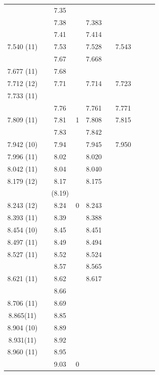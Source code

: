 {\begin{landscape}
\begin{center}
\begin{longtable}{cc cc cc cc cc}
	&		&	7.35	&		&	   	&		&		&		&		&		\\
	&		&	7.38	&		&	7.383	&		&		&		&		&		\\
	&		&	7.41	&		&	7.414	&		&		&		&		&		\\
  7.540 (11)  	&		&	7.53	&		&	7.528	&		&	7.543	&		&		&		\\
	&		&	7.67	&		&	7.668	&		&		&		&		&		\\
  7.677 (11)  	&		&	7.68	&		&	   	&		&		&		&		&		\\
  7.712 (12)  	&		&	7.71	&		&	7.714	&		&	7.723	&		&		&		\\
  7.733 (11)  	&		&		&		&		&		&		&		&		&		\\
	&		&	7.76	&		&	7.761	&		&	7.771	&		&		&		\\
  7.809 (11)  	&		&	7.81	&	1	&	7.808	&		&	7.815	&		&		&		\\
	&		&	7.83	&		&	7.842	&		&		&		&		&		\\
  7.942 (10)  	&		&	7.94	&		&	7.945	&		&	7.950	&		&		&		\\
  7.996 (11)  	&		&	8.02	&		&	8.020	&		&		&		&		&		\\
  8.042 (11)  	&		&	8.04	&		&	8.040	&		&		&		&		&		\\
  8.179 (12)  	&		&	8.17	&		&	8.175	&		&		&		&		&		\\
	&		&	(8.19)	&		&	  	&		&		&		&		&		\\
  8.243 (12)  	&		&	8.24	&	0	&	8.243	&		&		&		&		&		\\
  8.393 (11)  	&		&	8.39	&		&	8.388	&		&		&		&		&		\\
  8.454 (10)  	&		&	8.45	&		&	8.451	&		&		&		&		&		\\
  8.497 (11)  	&		&	8.49	&		&	8.494	&		&		&		&		&		\\
  8.527 (11)  	&		&	8.52	&		&	8.524	&		&		&		&		&		\\
	&		&	8.57	&		&	8.565	&		&		&		&		&		\\
  8.621 (11)  	&		&	8.62	&		&	8.617	&		&		&		&		&		\\
	&		&	8.66	&		&		&		&		&		&		&		\\
  8.706 (11)  	&		&	8.69	&		&		&		&		&		&		&		\\
   8.865(11)  	&		&	8.85	&		&		&		&		&		&		&		\\
  8.904 (10)  	&		&	8.89	&		&		&		&		&		&		&		\\
8.931(11)	&		&	8.92	&		&		&		&		&		&		&		\\
  8.960 (11)  	&		&	8.95	&		&		&		&		&		&		&		\\
	&		&	9.03	&	0	&		&		&		&		&		&		\\

\end{longtable}
\end{center}
\end{landscape}}
